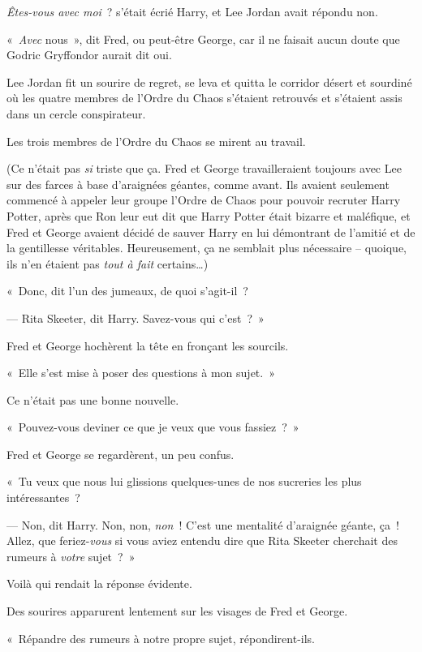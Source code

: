 \emph{Êtes-vous avec moi}~? s'était écrié Harry, et Lee Jordan avait répondu non.

«~\emph{Avec} nous~», dit Fred, ou peut-être George, car il ne faisait aucun doute que Godric Gryffondor aurait dit oui.

Lee Jordan fit un sourire de regret, se leva et quitta le corridor désert et sourdiné où les quatre membres de l'Ordre du Chaos s'étaient retrouvés et s'étaient assis dans un cercle conspirateur.

Les trois membres de l'Ordre du Chaos se mirent au travail.

(Ce n'était pas \emph{si} triste que ça.
Fred et George travailleraient toujours avec Lee sur des farces à base d'araignées géantes, comme avant.
Ils avaient seulement commencé à appeler leur groupe l'Ordre de Chaos pour pouvoir recruter Harry Potter, après que Ron leur eut dit que Harry Potter était bizarre et maléfique, et Fred et George avaient décidé de sauver Harry en lui démontrant de l'amitié et de la gentillesse véritables.
Heureusement, ça ne semblait plus nécessaire -- quoique, ils n'en étaient pas \emph{tout à fait} certains…)

«~Donc, dit l'un des jumeaux, de quoi s'agit-il~?

--- Rita Skeeter, dit Harry.
Savez-vous qui c'est~?~»

Fred et George hochèrent la tête en fronçant les sourcils.

«~Elle s'est mise à poser des questions à mon sujet.~»

Ce n'était pas une bonne nouvelle.

«~Pouvez-vous deviner ce que je veux que vous fassiez~?~»

Fred et George se regardèrent, un peu confus.

«~Tu veux que nous lui glissions quelques-unes de nos sucreries les plus intéressantes~?

--- Non, dit Harry.
Non, non, \emph{non}~!
C'est une mentalité d'araignée géante, ça~!
Allez, que feriez-\emph{vous} si vous aviez entendu dire que Rita Skeeter cherchait des rumeurs à \emph{votre} sujet~?~»

Voilà qui rendait la réponse évidente.

Des sourires apparurent lentement sur les visages de Fred et George.

«~Répandre des rumeurs à notre propre sujet, répondirent-ils.

